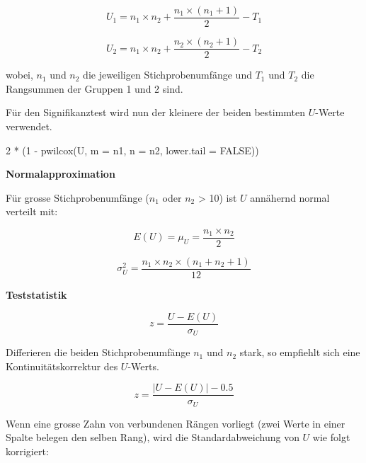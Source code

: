 \documentclass[
]{book}
\newenvironment{Shaded}{\begin{snugshade}}{\end{snugshade}}
\newcommand{\AttributeTok}[1]{\textcolor[rgb]{0.77,0.63,0.00}{#1}}
\newcommand{\ConstantTok}[1]{\textcolor[rgb]{0.00,0.00,0.00}{#1}}
\newcommand{\DecValTok}[1]{\textcolor[rgb]{0.00,0.00,0.81}{#1}}
\newcommand{\FunctionTok}[1]{\textcolor[rgb]{0.00,0.00,0.00}{#1}}
\newcommand{\NormalTok}[1]{#1}
\newcommand{\SpecialCharTok}[1]{\textcolor[rgb]{0.00,0.00,0.00}{#1}}
\begin{document}
\begin{equation}
  U_1 = n_1 \times n_2+\frac{n_1 \times (n_1+1)}{2} - T_1
  \label{eq:U1}
\end{equation}

\begin{equation}
  U_2 = n_1 \times n_2+\frac{n_2 \times (n_2+1)}{2} - T_2
  \label{eq:U2}
\end{equation}

wobei, \(n_1\) und \(n_2\) die jeweiligen Stichprobenumfänge und \(T_1\) und \(T_2\) die Rangsummen der Gruppen 1 und 2 sind.

Für den Signifikanztest wird nun der kleinere der beiden bestimmten \(U\)-Werte verwendet.

\begin{Shaded}
\begin{Highlighting}[]
\DecValTok{2} \SpecialCharTok{*}\NormalTok{ (}\DecValTok{1} \SpecialCharTok{{-}} \FunctionTok{pwilcox}\NormalTok{(U, }\AttributeTok{m =}\NormalTok{ n1, }\AttributeTok{n =}\NormalTok{ n2, }\AttributeTok{lower.tail =} \ConstantTok{FALSE}\NormalTok{))}
\end{Highlighting}
\end{Shaded}

\textbf{Normalapproximation}

Für grosse Stichprobenumfänge (\(n_1\) oder \(n_2\) \textgreater{} 10) ist \(U\) annähernd normal verteilt mit:

\begin{equation}
  E(U) = \mu_U = \frac{n_1 \times n_2}{2}
  \label{eq:mu-U}
\end{equation}

\begin{equation}
  \sigma_U^2 = \frac{n_1 \times n_2 \times (n_1 + n_2 + 1)}{12}
  \label{eq:var-U}
\end{equation}

\textbf{Teststatistik}

\begin{equation}
  z = \frac{U - E(U)}{\sigma_U}
  \label{eq:z-U}
\end{equation}

Differieren die beiden Stichprobenumfänge \(n_1\) und \(n_2\) stark, so empfiehlt sich eine Kontinuitätskorrektur des \(U\)-Werts.

\begin{equation}
  z = \frac{|U - E(U)|-0.5}{\sigma_U}
  \label{eq:z-U}
\end{equation}

Wenn eine grosse Zahn von verbundenen Rängen vorliegt (zwei Werte in einer Spalte belegen den selben Rang), wird die Standardabweichung von \(U\) wie folgt korrigiert:
\end{document}

